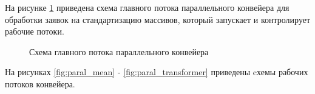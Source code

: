 На рисунке \ref{fig:parallel} приведена схема главного потока параллельного конвейера для обработки заявок на стандартизацию массивов, который запускает и контролирует рабочие потоки.

\newpage
\begin{figure}[h!]
	
	
	\caption{Схема главного потока параллельного конвейера}
	
	\label{fig:parallel}
	
\end{figure}

\newpage
На рисунках \ref{fig:paral_mean} - \ref{fig:paral_transformer} приведены cхемы рабочих потоков конвейера.


